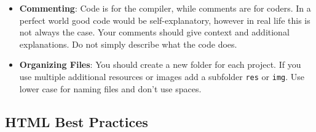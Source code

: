 \documentclass[english,11pt,a4paper]{report}
\newcommand{\bfb}[1]{{\bf \color{blue} #1}}
\begin{document}
\begin{itemize}
\item \bfb{Commenting}: Code is for the compiler, while comments are for coders.  In a perfect world good code would be self-explanatory, however in real life this is not always the case.  Your comments should give context and additional explanations. Do not simply describe what the code does.

\item \bfb{Organizing Files}: You should create a new folder for each project. If you use multiple additional resources or images add a subfolder \verb|res| or \verb|img|.  Use lower case for naming files and don't use spaces. 

\end{itemize}

\subsection{HTML Best Practices}
\end{document}
